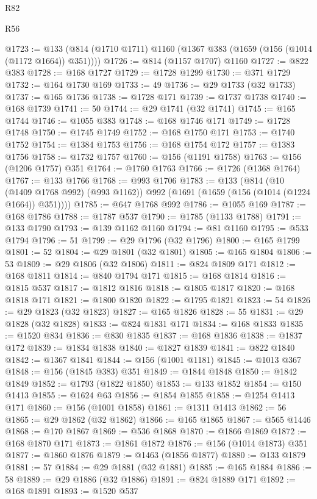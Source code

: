 \begin{lexlean}{R82}
\begin{lexlean}{R56}
\begin{coremodule}
{{{{{{{{{{{{{{{{{{{{{{{{{{{{{{{{{{{{{{{{{{{{{{{{{{{{{{{{{{{{{{{{{{{{{{{{{{{{{{{{{{{{{{{{{{{{{{{{{{{{{{{{{{{{{{{{{{{{{{{{{{{{{{{{{{{{{{{{{{{{{{{{{{{{{{{{{{{{{{{{{{{{{{{{{{{{{{{{{{{{{{{{{{{{{{{{{{{{{{{{{{{{{{{{{{{@1723 := @133 (@814 (@1710 @1711) @1160 (@1367 @383 (@1659 (@156 (@1014 (@1172 @1664)) @351))))
@1726 := @814 (@1157 @1707) @1160
@1727 := @822 @383
@1728 := @168 @1727
@1729 := @1728 @1299
@1730 := @371 @1729
@1732 := @164 @1730 @169
@1733 := 49
@1736 := @29 @1733 (@32 @1733)
@1737 := @165 @1736
@1738 := @1728 @171
@1739 := @1737 @1738
@1740 := @168 @1739
@1741 := 50
@1744 := @29 @1741 (@32 @1741)
@1745 := @165 @1744
@1746 := @1055 @383
@1748 := @168 @1746 @171
@1749 := @1728 @1748
@1750 := @1745 @1749
@1752 := @168 @1750 @171
@1753 := @1740 @1752
@1754 := @1384 @1753
@1756 := @168 @1754 @172
@1757 := @1383 @1756
@1758 := @1732 @1757
@1760 := @156 (@1191 @1758)
@1763 := @156 (@1206 @1757) @351
@1764 := @1760 @1763
@1766 := @1726 (@1368 @1764)
@1767 := @133 @1766
@1768 := @993 @1706
@1783 := @133
    (@814
      (@10 (@1409 @1768 @992) (@993 @1162))
      @992
      (@1691 (@1659 (@156 (@1014 (@1224 @1664)) @351))))
@1785 := @647 @1768 @992
@1786 := @1055 @169
@1787 := @168 @1786
@1788 := @1787 @537
@1790 := @1785 (@1133 @1788)
@1791 := @133 @1790
@1793 := @139 @1162 @1160
@1794 := @81 @1160
@1795 := @533 @1794
@1796 := 51
@1799 := @29 @1796 (@32 @1796)
@1800 := @165 @1799
@1801 := 52
@1804 := @29 @1801 (@32 @1801)
@1805 := @165 @1804
@1806 := 53
@1809 := @29 @1806 (@32 @1806)
@1811 := @824 @1809 @171
@1812 := @168 @1811
@1814 := @840 @1794 @171
@1815 := @168 @1814
@1816 := @1815 @537
@1817 := @1812 @1816
@1818 := @1805 @1817
@1820 := @168 @1818 @171
@1821 := @1800 @1820
@1822 := @1795 @1821
@1823 := 54
@1826 := @29 @1823 (@32 @1823)
@1827 := @165 @1826
@1828 := 55
@1831 := @29 @1828 (@32 @1828)
@1833 := @824 @1831 @171
@1834 := @168 @1833
@1835 := @1520 @834
@1836 := @830 @1835
@1837 := @168 @1836
@1838 := @1837 @172
@1839 := @1834 @1838
@1840 := @1827 @1839
@1841 := @822 @1840
@1842 := @1367 @1841
@1844 := @156 (@1001 @1181)
@1845 := @1013 @367
@1848 := @156 (@1845 @383) @351
@1849 := @1844 @1848
@1850 := @1842 @1849
@1852 := @1793 (@1822 @1850)
@1853 := @133 @1852
@1854 := @150 @1413
@1855 := @1624 @63
@1856 := @1854 @1855
@1858 := @1254 @1413 @171
@1860 := @156 (@1001 @1858)
@1861 := @1311 @1413
@1862 := 56
@1865 := @29 @1862 (@32 @1862)
@1866 := @165 @1865
@1867 := @565 @1446
@1868 := @170 @1867
@1869 := @536 @1868
@1870 := @1866 @1869
@1872 := @168 @1870 @171
@1873 := @1861 @1872
@1876 := @156 (@1014 @1873) @351
@1877 := @1860 @1876
@1879 := @1463 (@1856 @1877)
@1880 := @133 @1879
@1881 := 57
@1884 := @29 @1881 (@32 @1881)
@1885 := @165 @1884
@1886 := 58
@1889 := @29 @1886 (@32 @1886)
@1891 := @824 @1889 @171
@1892 := @168 @1891
@1893 := @1520 @537
}}}}}}}}}}}}}}}}}}}}}}}}}}}}}}}}}}}}}}}}}}}}}}}}}}}}}}}}}}}}}}}}}}}}}}}}}}}}}}}}}}}}}}}}}}}}}}}}}}}}}}}}}}}}}}}}}}}}}}}}}}}}}}}}}}}}}}}}}}}}}}}}}}}}}}}}}}}}}}}}}}}}}}}}}}}}}}}}}}}}}}}}}}}}}}}}}}}}}}}}}}}}}}}}}}}
\end{coremodule}
\end{lexlean}
\end{lexlean}
